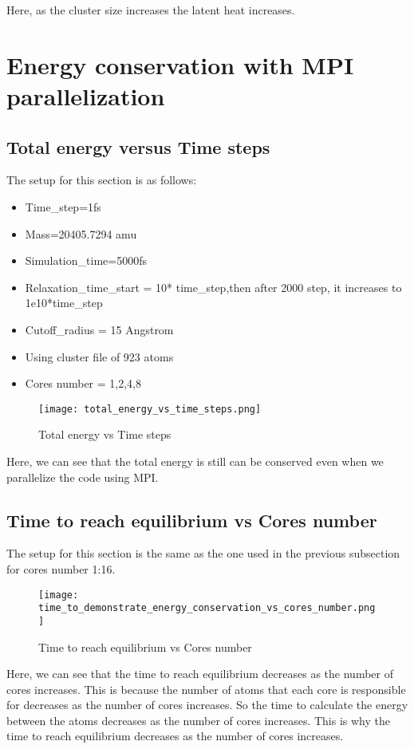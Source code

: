     Here, as the cluster size increases the latent heat increases.

\section{Energy conservation with MPI parallelization}
    \subsection{Total energy versus Time steps}
    The setup for this section is as follows:
    \begin{itemize}
        \item Time\_step=1fs
        \item Mass=20405.7294 amu
        \item Simulation\_time=5000fs
        \item Relaxation\_time\_start = 10* time\_step,then after 2000 step, it increases to 1e10*time\_step
        \item Cutoff\_radius = 15 Angstrom
        \item Using cluster file of 923 atoms
        \item Cores number = 1,2,4,8
    \end{itemize}
    \graphicspath{ {./figures/milestone08/} }
        \begin{figure}[!htb]
        \centering
            \texttt{[image: total\_energy\_vs\_time\_steps.png]}
            \caption{Total energy vs Time steps}
        \end{figure}

        Here, we can see that the total energy is still can be conserved even when we parallelize the code using MPI.

    \subsection{Time to reach equilibrium vs Cores number}
    The setup for this section is the same as the one used in the previous subsection for cores number 1:16.
        \graphicspath{ {./figures/milestone08/} }
        \begin{figure}[!htb]
        \centering
            \texttt{[image: time\_to\_demonstrate\_energy\_conservation\_vs\_cores\_number.png]}
            \caption{Time to reach equilibrium vs Cores number}
        \end{figure}  

        Here, we can see that the time to reach equilibrium decreases as the number of cores increases. This is because the number of atoms that each core is responsible for decreases as the number of cores increases. So the time to calculate the energy between the atoms decreases as the number of cores increases. This is why the time to reach equilibrium decreases as the number of cores increases.

